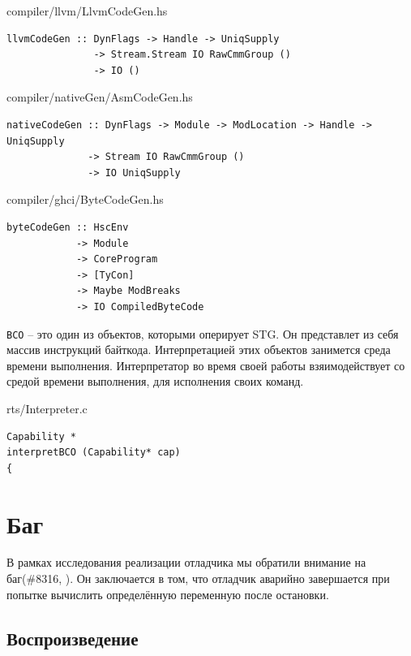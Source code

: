 \documentclass[fontsize=14pt, paper=a4, pagesize, DIV=calc]{scrartcl}
\def\code#1{\texttt{#1}}
\begin{document}
\begin{ListingEnv}
\caption{compiler/llvm/LlvmCodeGen.hs}
\begin{lstlisting}[firstnumber=44]
llvmCodeGen :: DynFlags -> Handle -> UniqSupply
               -> Stream.Stream IO RawCmmGroup ()
               -> IO ()
\end{lstlisting}
\end{ListingEnv}

\begin{ListingEnv}
\caption{compiler/nativeGen/AsmCodeGen.hs}
\begin{lstlisting}[firstnumber=108]
nativeCodeGen :: DynFlags -> Module -> ModLocation -> Handle -> UniqSupply
              -> Stream IO RawCmmGroup ()
              -> IO UniqSupply
\end{lstlisting}
\end{ListingEnv}

\begin{ListingEnv}
\caption{compiler/ghci/ByteCodeGen.hs}
\begin{lstlisting}[firstnumber=81]
byteCodeGen :: HscEnv
            -> Module
            -> CoreProgram
            -> [TyCon]
            -> Maybe ModBreaks
            -> IO CompiledByteCode
\end{lstlisting}
\end{ListingEnv}

\code{BCO} -- это один из объектов, которыми оперирует STG. Он представлет из
себя массив инструкций байткода. Интерпретацией этих объектов занимется среда
времени выполнения. Интерпретатор во время своей работы взяимодействует со
средой времени выполнения, для исполнения своих команд.

\begin{ListingEnv}
\caption{rts/Interpreter.c}
\begin{lstlisting}[firstnumber=295]
Capability *
interpretBCO (Capability* cap)
{
\end{lstlisting}
\end{ListingEnv}

\section{Баг}

В рамках исследования реализации отладчика мы обратили внимание на баг(\#{}8316,
\cite{bug}). Он заключается в том, что отладчик аварийно завершается при попытке
вычислить определённую переменную после остановки.

\subsection{Воспроизведение}
\end{document}
